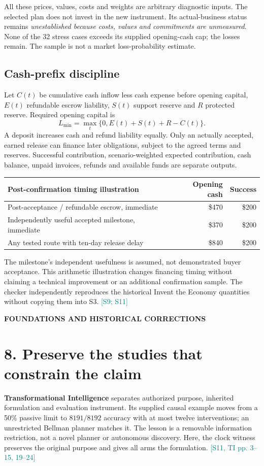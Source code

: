 \documentclass[10pt,letterpaper]{article}
\newcommand{\src}[1]{\textcolor{Teal}{\scriptsize[#1]}}
\newcommand{\eyebrow}[1]{{\small\bfseries\color{Gold}\MakeUppercase{#1}}\par}
\newcommand{\pagename}[2]{\eyebrow{#1}\section*{#2}}
\begin{document}
All these prices, values, costs and weights are arbitrary diagnostic inputs. The selected plan does not invest in the new instrument. Its actual-business status remains \emph{unestablished because costs, values and commitments are unmeasured}. None of the 32 stress cases exceeds its supplied opening-cash cap; the losses remain. The sample is not a market loss-probability estimate.

\subsection*{Cash-prefix discipline}
Let $C(t)$ be cumulative cash inflow less cash expense before opening capital, $E(t)$ refundable escrow liability, $S(t)$ support reserve and $R$ protected reserve. Required opening capital is
\[
L_{\min}=\max_t\bigl\{0,E(t)+S(t)+R-C(t)\bigr\}.
\]
A deposit increases cash and refund liability equally. Only an actually accepted, earned release can finance later obligations, subject to the agreed terms and reserves. Successful contribution, scenario-weighted expected contribution, cash balance, unpaid invoices, refunds and available funds are separate outputs.

\begin{tabularx}{\linewidth}{@{}Yrr@{}}
\toprule
\textbf{Post-confirmation timing illustration} & \textbf{Opening cash} & \textbf{Success} \\
\midrule
Post-acceptance / refundable escrow, immediate & \$470 & \$200 \\
Independently useful accepted milestone, immediate & \$370 & \$200 \\
Any tested route with ten-day release delay & \$840 & \$200 \\
\bottomrule
\end{tabularx}
The milestone's independent usefulness is assumed, not demonstrated buyer acceptance. This arithmetic illustration changes financing timing without claiming a technical improvement or an additional confirmation sample. The checker independently reproduces the historical Invent the Economy quantities without copying them into S3. \src{S9; S11}

\newpage
\pagename{Foundations and historical corrections}{8. Preserve the studies that constrain the claim}
\textbf{Transformational Intelligence} separates authorized purpose, inherited formulation and evaluation instrument. Its supplied causal example moves from a 50\% passive limit to $8191/8192$ accuracy with at most twelve interventions; an unrestricted Bellman planner matches it. The lesson is a removable information restriction, not a novel planner or autonomous discovery. Here, the clock witness preserves the original purpose and gives all arms the formulation. \src{S11, TI pp. 3--15, 19--24}
\end{document}
